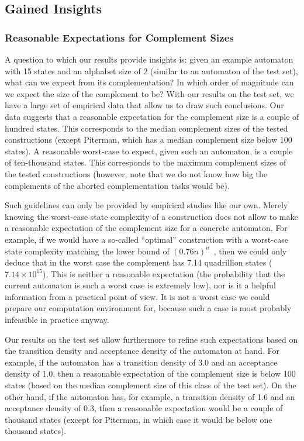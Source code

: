\subsection{Gained Insights}
\label{5_insights}

\subsubsection{Reasonable Expectations for Complement Sizes}
A question to which our results provide insights is: given an example automaton with 15 states and an alphabet size of 2 (similar to an automaton of the \goal{} test set), what can we expect from its complementation? In which order of magnitude can we expect the size of the complement to be? With our results on the \goal{} test set, we have a large set of empirical data that allow us to draw such conclusions. Our data suggests that a reasonable expectation for the complement size is a couple of hundred states. This corresponds to the median complement sizes of the tested constructions (except Piterman, which has a median complement size below 100 states). A reasonable worst-case to expect, given such an automaton, is a couple of ten-thousand states. This corresponds to the maximum complement sizes of the tested constructions (however, note that we do not know how big the complements of the aborted complementation tasks would be).

Such guidelines can only be provided by empirical studies like our own. Merely knowing the worst-case state complexity of a construction does not allow to make a reasonable expectation of the complement size for a concrete automaton. For example, if we would have a so-called ``optimal'' construction with a worst-case state complexity matching the lower bound of $(0.76n)^n$~\cite{DBLP:journals/corr/abs-0802-1226}, then we could only deduce that in the worst case the complement has 7.14 quadrillion states ($7.14 \times 10^{15}$). This is neither a reasonable expectation (the probability that the current automaton is such a worst case is extremely low), nor is it a helpful information from a practical point of view. It is not a worst case we could prepare our computation environment for, because such a case is most probably infeasible in practice anyway.  

Our results on the \goal{} test set allow furthermore to refine such expectations based on the transition density and acceptance density of the automaton at hand. For example, if the automaton has a transition density of 3.0 and an acceptance density of 1.0, then a reasonable expectation of the complement size is below 100 states (based on the median complement size of this class of the \goal{} test set). On the other hand, if the automaton has, for example, a transition density of 1.6 and an acceptance density of 0.3, then a reasonable expectation would be a couple of thousand states (except for Piterman, in which case it would be below one thousand states).

